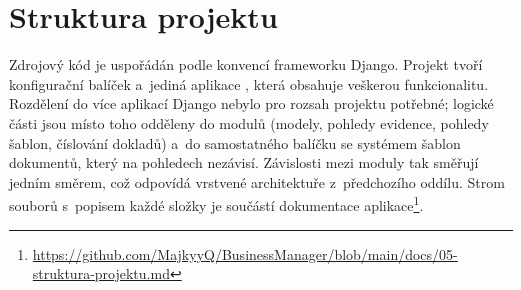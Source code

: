 \section{Struktura projektu}\label{sec:struktura-projektu}

Zdrojový kód je uspořádán podle konvencí frameworku Django. Projekt tvoří konfigurační balíček  a~jediná aplikace , která obsahuje veškerou funkcionalitu. Rozdělení do více aplikací Django nebylo pro rozsah projektu potřebné; logické části jsou místo toho odděleny do modulů (modely, pohledy evidence, pohledy šablon, číslování dokladů) a~do samostatného balíčku  se systémem šablon dokumentů, který na pohledech nezávisí. Závislosti mezi moduly tak směřují jedním směrem, což odpovídá vrstvené architektuře z~předchozího oddílu. Strom souborů s~popisem každé složky je součástí dokumentace aplikace\footnote{\url{https://github.com/MajkyyQ/BusinessManager/blob/main/docs/05-struktura-projektu.md}}.
